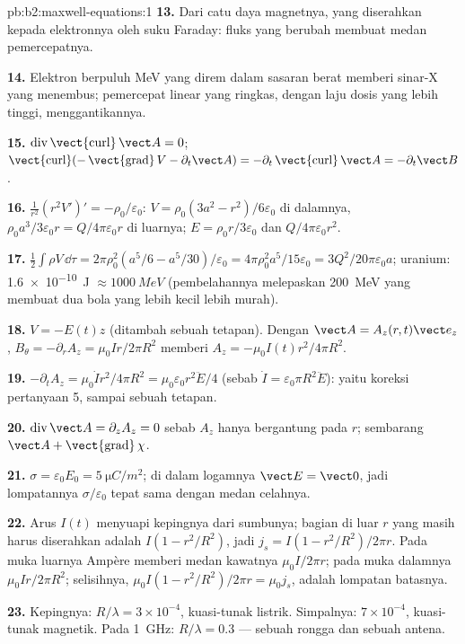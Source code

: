 \begin{solution}{pb:b2:maxwell-equations:1}
\textbf{13.} Dari catu daya magnetnya, yang diserahkan kepada elektronnya oleh
suku Faraday: fluks yang berubah membuat medan pemercepatnya.

\textbf{14.} Elektron berpuluh MeV yang direm dalam sasaran berat memberi
sinar-X yang menembus; pemercepat linear yang ringkas, dengan laju dosis
yang lebih tinggi, menggantikannya.

\textbf{15.} $\operatorname{div}\operatorname{\vect{curl}}\vect A = 0$; $\operatorname{\vect{curl}}(-\operatorname{\vect{grad}}
V - \partial_t\vect A) = -\partial_t\operatorname{\vect{curl}}\vect A = -\partial_t\vect B$.

\textbf{16.} $\frac1{r^2}(r^2V')' = -\rho_0/\varepsilon_0$: $V = \rho_0(3a^2 - r^2)/6\varepsilon_0$
di dalamnya, $\rho_0a^3/3\varepsilon_0r = Q/4\pi\varepsilon_0r$ di luarnya; $E = \rho_0r/3\varepsilon_0$ dan
$Q/4\pi\varepsilon_0r^2$.

\textbf{17.} $\tfrac12\int\rho V\,\dd\tau = 2\pi\rho_0^2(a^5/6 - a^5/30)/\varepsilon_0 = 4\pi\rho_0^2a^5/
15\varepsilon_0 = 3Q^2/20\pi\varepsilon_0a$; uranium: \qty{1.6e-10}{J} $\approx \qty{1000}{MeV}$ (pembelahannya
melepaskan \qty{200}{MeV} yang membuat dua bola yang lebih kecil lebih murah).

\textbf{18.} $V = -E(t)z$ (ditambah sebuah tetapan). Dengan $\vect A = A_z(r, t)\vect e_z$,
$B_\theta = -\partial_rA_z = \mu_0Ir/2\pi R^2$ memberi $A_z = -\mu_0I(t)r^2/4\pi R^2$.

\textbf{19.} $-\partial_tA_z = \mu_0\dot Ir^2/4\pi R^2 = \mu_0\varepsilon_0r^2\ddot E/4$ (sebab $\dot I =
\varepsilon_0\pi R^2\ddot E$): yaitu koreksi pertanyaan 5, sampai sebuah tetapan.

\textbf{20.} $\operatorname{div}\vect A = \partial_zA_z = 0$ sebab $A_z$ hanya bergantung pada $r$;
sembarang $\vect A + \operatorname{\vect{grad}}\chi$.

\textbf{21.} $\sigma = \varepsilon_0E_0 = \qty{5}{\micro C/m^2}$; di dalam logamnya $\vect E =
\vect 0$, jadi lompatannya $\sigma/\varepsilon_0$ tepat sama dengan medan celahnya.

\textbf{22.} Arus $I(t)$ menyuapi kepingnya dari sumbunya; bagian
di luar $r$ yang masih harus diserahkan adalah $I(1 - r^2/R^2)$, jadi $j_s = I(1 -
r^2/R^2)/2\pi r$. Pada muka luarnya Ampère memberi medan kawatnya $\mu_0I/
2\pi r$; pada muka dalamnya $\mu_0Ir/2\pi R^2$; selisihnya, $\mu_0I(1 -
r^2/R^2)/2\pi r = \mu_0j_s$, adalah lompatan batasnya.

\textbf{23.} Kepingnya: $R/\lambda = 3 \times 10^{-4}$, kuasi-tunak listrik. Simpalnya: $7 \times 10^{-4}$,
kuasi-tunak magnetik. Pada \qty{1}{GHz}: $R/\lambda = 0.3$ --- sebuah rongga dan sebuah antena.


\end{solution}

